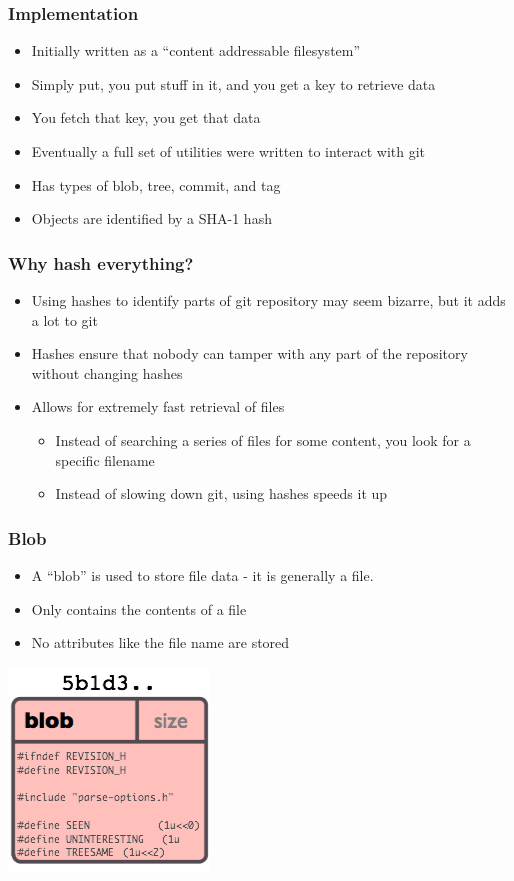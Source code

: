 \documentclass{beamer}
\begin{document}
\begin{frame}
  \frametitle{Implementation}
  \begin{itemize}
    \item Initially written as a ``content addressable filesystem''
    \item Simply put, you put stuff in it, and you get a key to retrieve data
    \item You fetch that key, you get that data
    \item Eventually a full set of utilities were written to interact with git
    \item Has types of blob, tree, commit, and tag
    \item Objects are identified by a SHA-1 hash
  \end{itemize}
\end{frame}

\begin{frame}
  \frametitle{Why hash everything?}
  \begin{itemize}
    \item Using hashes to identify parts of git repository may seem bizarre, but it adds a lot to git
    \item Hashes ensure that nobody can tamper with any part of the repository without changing hashes
    \item Allows for extremely fast retrieval of files
      \begin{itemize}
	\item Instead of searching a series of files for some content, you look for a specific filename
	\item Instead of slowing down git, using hashes speeds it up
      \end{itemize}
  \end{itemize}
\end{frame}

\begin{frame}
  \frametitle{Blob}
  \begin{itemize}
    \item A ``blob'' is used to store file data - it is generally a file.
    \item Only contains the contents of a file 
    \item No attributes like the file name are stored
  \end{itemize}
  \includegraphics[scale = .7]{images/object-blob.png}
\end{frame}
\end{document}
